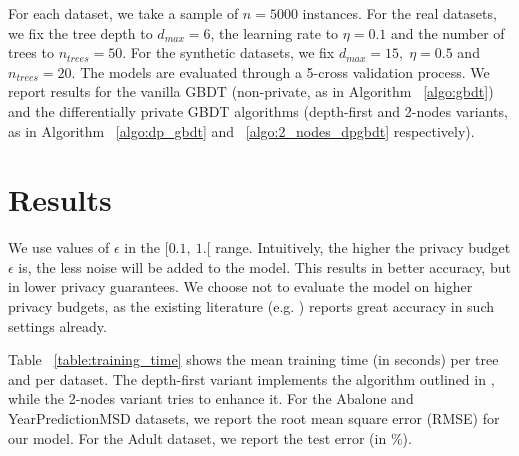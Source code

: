 For each dataset, we take a sample of $n = 5000$ instances. For the real datasets, we fix the tree depth to $d_{max} = 6$, the learning rate to $\eta = 0.1$ and the number of trees to $n_{trees} = 50$. For the synthetic datasets, we fix $d_{max} = 15, \; \eta = 0.5$ and $n_{trees} = 20$. The models are evaluated through a 5-cross validation process. We report results for the vanilla GBDT (non-private, as in Algorithm ~\ref{algo:gbdt}) and the differentially private GBDT algorithms (depth-first and 2-nodes variants, as in Algorithm ~\ref{algo:dp_gbdt} and ~\ref{algo:2_nodes_dpgbdt} respectively).

\newpage

\section{Results}

We use values of $\epsilon$ in the $[0.1, \ 1.[$ range. Intuitively, the higher the privacy budget $\epsilon$ is, the less noise will be added to the model. This results in better accuracy, but in lower privacy guarantees. We choose not to evaluate the model on higher privacy budgets, as the existing literature (e.g. \cite{dpgbdt}) reports great accuracy in such settings already. 

Table ~\ref{table:training_time} shows the mean training time (in seconds) per tree and per dataset. The depth-first variant implements the algorithm outlined in \cite{dpgbdt}, while the 2-nodes variant tries to enhance it. For the Abalone and YearPredictionMSD datasets, we report the root mean square error (RMSE) for our model. For the Adult dataset, we report the test error (in \%). 

\begin{center}\begin{table}[h!]
	\center
	\noindent{}
\end{table}\end{center}

